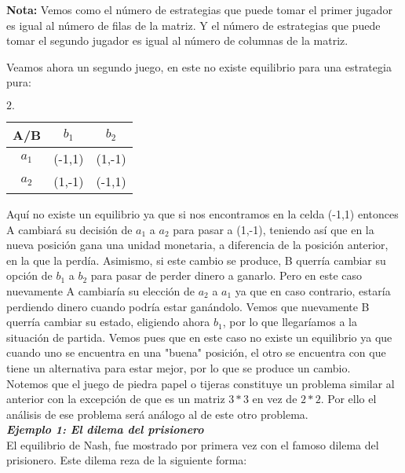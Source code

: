\documentclass[10pt,a4paper]{book}
\begin{document}
\textbf{Nota:} Vemos como el número de estrategias que puede tomar el primer jugador es igual al número de filas de la matriz. Y el número de estrategias que puede tomar el segundo jugador es igual al número de columnas de la matriz.



Veamos ahora un segundo juego, en este no existe equilibrio para una estrategia pura:\\


\begin{center}
		$2. \quad$
	\begin{tabular}{|c|c|c|}
		\hline
		A/B & $b_1$ & $b_2$ \\
		\hline
		$a_1$ & (-1,1) & (1,-1) \\
		\hline
		$a_2$ & (1,-1) & (-1,1) \\
		\hline
	\end{tabular}
\end{center}

Aquí no existe un equilibrio ya que si nos encontramos en la celda (-1,1) entonces A cambiará su decisión de $a_1$ a $a_2$ para pasar a (1,-1), teniendo así que en la nueva posición gana una unidad monetaria, a diferencia de la posición anterior, en la que la perdía. Asimismo, si este cambio se produce, B querría cambiar su opción de $b_1$ a $b_2$ para pasar de perder dinero a ganarlo. Pero en este caso nuevamente A cambiaría su elección de $a_2$ a $a_1$ ya que en caso contrario, estaría perdiendo dinero cuando podría estar ganándolo. Vemos que nuevamente B querría cambiar su estado, eligiendo ahora $b_1$, por lo que llegaríamos a la situación de partida. Vemos pues que en este caso no existe un equilibrio ya que cuando uno se encuentra en una "buena"  posición, el otro se encuentra con que tiene un alternativa para estar mejor, por lo que se produce un cambio.\\


Notemos que el juego de piedra papel o tijeras constituye un problema similar al anterior con la excepción de que es un matriz $3*3$ en vez de $2*2$. Por ello el análisis de ese problema será análogo al de este otro problema.\\


\textit{\textbf{Ejemplo 1: El dilema del prisionero}} \\

El equilibrio de Nash, fue mostrado por primera vez con el famoso dilema del prisionero. Este dilema reza de la siguiente forma:\\
\end{document}
